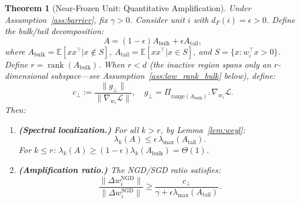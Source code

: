 \documentclass{article}
\providecommand{\E}{\mathbb{E}}
\providecommand{\norm}[1]{\lVert #1 \rVert}
\DeclareMathOperator{\rank}{rank}
\theoremstyle{plain}
\newtheorem{theorem}{Theorem}
\theoremstyle{definition}
\theoremstyle{remark}
\begin{document}
\begin{theorem}[Near-Frozen Unit: Quantitative Amplification]
\label{thm:barrier}
Under Assumption~\ref{ass:barrier}, fix $\gamma > 0$. Consider unit $i$ with $d_F(i) = \epsilon > 0$. Define the \emph{bulk/tail decomposition}:
\begin{equation}
\label{eq:cov_decomp}
    A = (1-\epsilon)A_{\mathrm{bulk}} + \epsilon A_{\mathrm{tail}},
\end{equation}
where $A_{\mathrm{bulk}} = \E[xx^\top|x\notin S]$, $A_{\mathrm{tail}} = \E[xx^\top|x \in S]$, and $S = \{x : w_i^\top x > 0\}$. Define $r = \rank(A_{\mathrm{bulk}})$. When $r < d$ (the inactive region spans only an $r$-dimensional subspace---see Assumption~\ref{ass:low_rank_bulk} below), define:
\begin{equation}
\label{eq:c_perp}
    c_\perp := \frac{\norm{g_\perp}}{\norm{\nabla_{w_i}\mathcal{L}}}, \quad g_\perp = \Pi_{\mathrm{range}(A_{\mathrm{bulk}})^\perp}\nabla_{w_i}\mathcal{L}.
\end{equation}
Then:
\begin{enumerate}
\item[(a)] \textbf{(Spectral localization.)} For all $k > r$, by Lemma~\ref{lem:weyl}:
\begin{equation}
    \lambda_k(A) \leq \epsilon\,\lambda_{\max}(A_{\mathrm{tail}}).
\end{equation}
For $k \leq r$: $\lambda_k(A) \geq (1-\epsilon)\lambda_k(A_{\mathrm{bulk}}) = \Theta(1)$.

\item[(b)] \textbf{(Amplification ratio.)} The NGD/SGD ratio satisfies:
\begin{equation}
\label{eq:amp_ratio}
    \frac{\norm{\Delta w_i^{\mathrm{NGD}}}}{\norm{\Delta w_i^{\mathrm{SGD}}}} \geq \frac{c_\perp}{\gamma + \epsilon\lambda_{\max}(A_{\mathrm{tail}})}.
\end{equation}
\end{enumerate}
\end{theorem}
\end{document}
